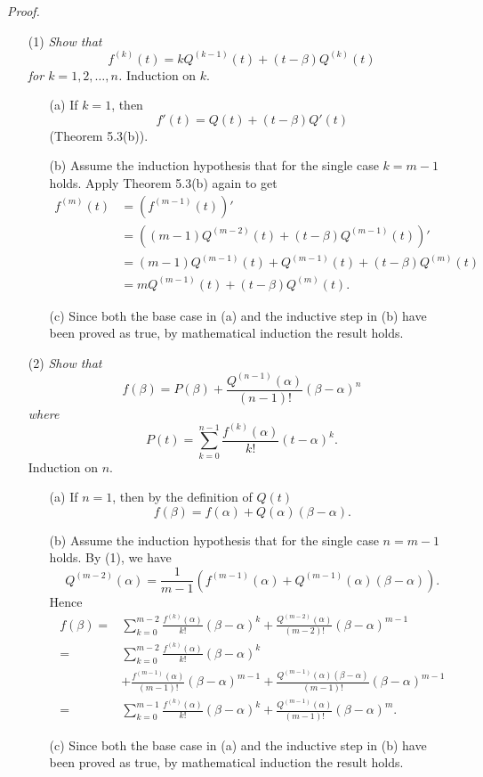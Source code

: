 \documentclass{article}
\begin{document}
\emph{Proof.}
\begin{enumerate}
  \item[(1)]
  \emph{Show that
  \[
    f^{(k)}(t) = kQ^{(k-1)}(t) + (t - \beta)Q^{(k)}(t)
  \]
  for $k = 1, 2, \ldots, n$.}
  Induction on $k$.
  \begin{enumerate}
  \item[(a)]
  If $k = 1$, then
  \[
    f'(t) = Q(t) + (t-\beta)Q'(t)
  \]
  (Theorem 5.3(b)).

  \item[(b)]
  Assume the induction hypothesis that for the single case $k = m-1$ holds.
  Apply Theorem 5.3(b) again to get
  \begin{align*}
    f^{(m)}(t)
    &= (f^{(m-1)}(t))' \\
    &= ((m-1)Q^{(m-2)}(t) + (t - \beta)Q^{(m-1)}(t))' \\
    &= (m-1)Q^{(m-1)}(t) + Q^{(m-1)}(t) + (t - \beta)Q^{(m)}(t) \\
    &= mQ^{(m-1)}(t) + (t - \beta)Q^{(m)}(t).
  \end{align*}

  \item[(c)]
  Since both the base case in (a) and
  the inductive step in (b) have been proved as true,
  by mathematical induction the result holds.
  \end{enumerate}

  \item[(2)]
  \emph{Show that
  \[
    f(\beta) = P(\beta)
    + \frac{Q^{(n-1)}(\alpha)}{(n-1)!} (\beta - \alpha)^n
  \]
  where}
  \[
    P(t) = \sum_{k=0}^{n-1} \frac{f^{(k)}(\alpha)}{k!}(t - \alpha)^k.
  \]
  Induction on $n$.
  \begin{enumerate}
  \item[(a)]
  If $n = 1$, then by the definition of $Q(t)$
  \[
    f(\beta) = f(\alpha) + Q(\alpha)(\beta - \alpha).
  \]

  \item[(b)]
  Assume the induction hypothesis that for the single case $n = m-1$ holds.
  By (1), we have
  \[
    Q^{(m-2)}(\alpha) = \frac{1}{m-1}( f^{(m-1)}(\alpha) + Q^{(m-1)}(\alpha)(\beta - \alpha) ).
  \]
  Hence
  \begin{align*}
    f(\beta)
    =& \sum_{k=0}^{m-2} \frac{f^{(k)}(\alpha)}{k!}(\beta - \alpha)^k
      + \frac{Q^{(m-2)}(\alpha)}{(m-2)!} (\beta - \alpha)^{m-1} \\
    =& \sum_{k=0}^{m-2} \frac{f^{(k)}(\alpha)}{k!}(\beta - \alpha)^k \\
      &+ \frac{ f^{(m-1)}(\alpha) }{(m-1)!} (\beta - \alpha)^{m-1}
      + \frac{Q^{(m-1)}(\alpha)(\beta - \alpha)}{(m-1)!} (\beta - \alpha)^{m-1} \\
    =& \sum_{k=0}^{m-1} \frac{f^{(k)}(\alpha)}{k!}(\beta - \alpha)^k
      + \frac{Q^{(m-1)}(\alpha)}{(m-1)!} (\beta - \alpha)^{m}.
  \end{align*}

  \item[(c)]
  Since both the base case in (a) and
  the inductive step in (b) have been proved as true,
  by mathematical induction the result holds.
  \end{enumerate}
\end{enumerate}
\end{document}
